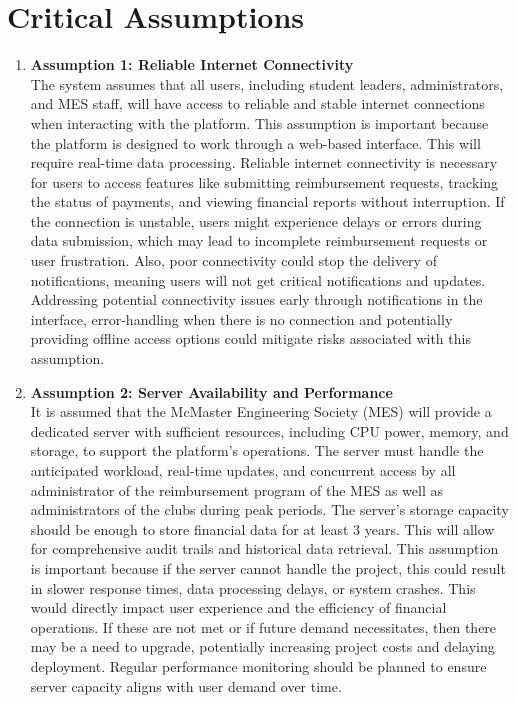 \documentclass{article}
\begin{document}

\section{Critical Assumptions}
\begin{enumerate}
    \item \textbf{Assumption 1: Reliable Internet Connectivity} \\
    The system assumes that all users, including student leaders, administrators, and MES staff, will have access to reliable and stable internet connections when interacting with the platform. This assumption is important because the platform is designed to work through a web-based interface. This will require real-time data processing. Reliable internet connectivity is necessary for users to access features like submitting reimbursement requests, tracking the status of payments, and viewing financial reports without interruption. If the connection is unstable, users might experience delays or errors during data submission, which may lead to incomplete reimbursement requests or user frustration. Also, poor connectivity could stop the delivery of notifications, meaning users will not get critical notifications and updates. Addressing potential connectivity issues early through notifications in the interface, error-handling when there is no connection and potentially providing offline access options could mitigate risks associated with this assumption.

    \item \textbf{Assumption 2: Server Availability and Performance} \\
    It is assumed that the McMaster Engineering Society (MES) will provide a dedicated server with sufficient resources, including CPU power, memory, and storage, to support the platform's operations. The server must handle the anticipated workload, real-time updates, and concurrent access by all administrator of the reimbursement program of the MES as well as administrators of the clubs during peak periods. The server's storage capacity should be enough to store financial data for at least 3 years. This will allow for comprehensive audit trails and historical data retrieval. This assumption is important because if the server cannot handle the project, this could result in slower response times, data processing delays, or system crashes. This would directly impact user experience and the efficiency of financial operations. If these are not met or if future demand necessitates, then there may be a need to upgrade, potentially increasing project costs and delaying deployment. Regular performance monitoring should be planned to ensure server capacity aligns with user demand over time.


\end{enumerate}
\end{document}
